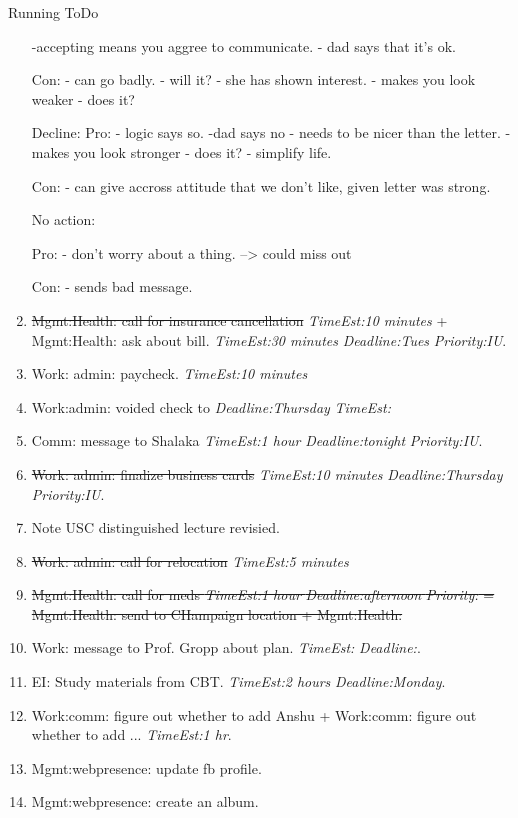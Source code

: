 \documentclass[serif, mathserif, final]{beamer}
\newcommand{\doneTaskNoItem}[1]{\sout{#1}}
\newcommand{\doneTask}[1]{\tiny \item \tiny \sout{#1}}
\newcommand{\te}[1]{\textit{TimeEst:}\textit{#1}}
\newcommand{\dl}[1]{\textit{Deadline:}\textit{#1}}
\newcommand{\pr}[1]{\textit{Priority:}\textit{#1}}
\begin{document}
\begin{frame}
\begin{columns}
\begin{column}{0.5\linewidth}
\begin{block}{Running ToDo}
\begin{enumerate}
    -accepting means you aggree to communicate. 
    - dad says that it's ok. 

    Con: 
    - can go badly. - will it? - she has shown interest. 
    - makes you look weaker - does it? 

    Decline:  
    Pro:
    - logic says so. -dad says no - needs to be nicer than the
    letter. 
    - makes you look stronger - does it?  - simplify life.

    Con: 
    -  can give accross attitude that we don't like, given
    letter was strong.


No action: 

   Pro:  
    - don't worry about a thing.  --> could miss out 

   Con: 
    - sends bad message.

  \item \tiny \doneTaskNoItem{Mgmt:Health: call for insurance
    cancellation} \te{10 minutes} + Mgmt:Health: ask about
    bill. \te{30 minutes} \dl{Tues} \pr{IU}.
  
  \item \tiny Work: admin: paycheck. \te{10 minutes}
    
  \item \tiny Work:admin: voided check to \dl{Thursday} \te{}
 
  \item \tiny Comm: message to Shalaka \te{1 hour} \dl{tonight}
    \pr{IU}.
    
    \doneTask{Work: admin: finalize business cards} \te{10 minutes}
    \dl{Thursday} \pr{IU}. 

\item \tiny Note USC distinguished lecture revisied. 

  \doneTask{Work: admin: call for relocation} \te{5 minutes}

  \doneTask{Mgmt:Health: call for meds \te{1 hour} \dl{afternoon}
    \pr{} =  Mgmt:Health: send to CHampaign location + Mgmt:Health:}

  \item \tiny Work: message to Prof. Gropp about plan. \te{} \dl{}.
  \item \tiny EI: Study materials from CBT.  \te{2 hours} \dl{Monday}.

  \item \tiny Work:comm: figure out whether to add Anshu + Work:comm:
    figure out whether to add ... \te{1 hr}. 


  \item \tiny Mgmt:webpresence: update fb profile. 
  \item \tiny Mgmt:webpresence: create an album.


\end{enumerate}
\end{block}
\end{column}
\end{columns}
\end{frame}
\end{document}
